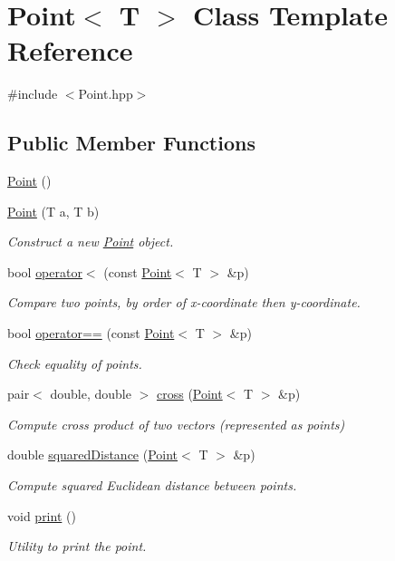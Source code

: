 \hypertarget{classPoint}{}\section{Point$<$ T $>$ Class Template Reference}
\label{classPoint}


{\ttfamily \#include $<$Point.\+hpp$>$}

\subsection*{Public Member Functions}
\begin{DoxyCompactItemize}
\item 
\mbox{\hyperlink{classPoint_aea76b1130f1a203722d8f2254ced8e66}{Point}} ()
\item 
\mbox{\hyperlink{classPoint_a6583d71c9cddfe6e079135c724ea228c}{Point}} (T a, T b)
\begin{DoxyCompactList}\small\item\em Construct a new \mbox{\hyperlink{classPoint}{Point}} object. \end{DoxyCompactList}\item 
bool \mbox{\hyperlink{classPoint_a7e220ceafc554dbb07185138eb3f4c20}{operator$<$}} (const \mbox{\hyperlink{classPoint}{Point}}$<$ T $>$ \&p)
\begin{DoxyCompactList}\small\item\em Compare two points, by order of x-\/coordinate then y-\/coordinate. \end{DoxyCompactList}\item 
bool \mbox{\hyperlink{classPoint_a5859891ca462697243a8cfa1e27cb91c}{operator==}} (const \mbox{\hyperlink{classPoint}{Point}}$<$ T $>$ \&p)
\begin{DoxyCompactList}\small\item\em Check equality of points. \end{DoxyCompactList}\item 
pair$<$ double, double $>$ \mbox{\hyperlink{classPoint_a79b5e5f4d1e341cacfc6a5fa84eb80ee}{cross}} (\mbox{\hyperlink{classPoint}{Point}}$<$ T $>$ \&p)
\begin{DoxyCompactList}\small\item\em Compute cross product of two vectors (represented as points) \end{DoxyCompactList}\item 
double \mbox{\hyperlink{classPoint_a42457398f330b900143532892ea1d0f5}{squared\+Distance}} (\mbox{\hyperlink{classPoint}{Point}}$<$ T $>$ \&p)
\begin{DoxyCompactList}\small\item\em Compute squared Euclidean distance between points. \end{DoxyCompactList}\item 
void \mbox{\hyperlink{classPoint_acc51bfe04c5f9bcb8686e74d8f7b7bc1}{print}} ()
\begin{DoxyCompactList}\small\item\em Utility to print the point. \end{DoxyCompactList}\end{DoxyCompactItemize}
